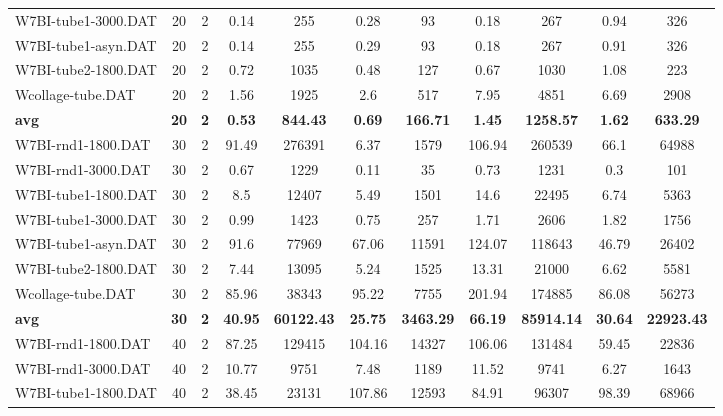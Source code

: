 \begin{table}[!ht]
\begin{tabular}{lcccccccccc}
W7BI-tube1-3000.DAT & 20 & 2 &  \textcolor{blue2}{0.14} & 255 & 0.28 & 93 & 0.18 & 267 & 0.94 & 326 \\
W7BI-tube1-asyn.DAT & 20 & 2 &  \textcolor{blue2}{0.14} & 255 & 0.29 & 93 & 0.18 & 267 & 0.91 & 326 \\
W7BI-tube2-1800.DAT & 20 & 2 & 0.72 & 1035 &  \textcolor{blue2}{0.48} & 127 & 0.67 & 1030 & 1.08 & 223 \\
Wcollage-tube.DAT & 20 & 2 &  \textcolor{blue2}{1.56} & 1925 & 2.6 & 517 & 7.95 & 4851 & 6.69 & 2908 \\
\cline{1-11} \textbf{avg} & \textbf{20} & \textbf{2} & \textbf{0.53} & \textbf{844.43} & \textbf{0.69} & \textbf{166.71} & \textbf{1.45} & \textbf{1258.57} & \textbf{1.62} & \textbf{633.29} \\ \cline{1-11}
W7BI-rnd1-1800.DAT & 30 & 2 & 91.49 & 276391 &  \textcolor{blue2}{6.37} & 1579 & 106.94 & 260539 & 66.1 & 64988 \\
W7BI-rnd1-3000.DAT & 30 & 2 & 0.67 & 1229 &  \textcolor{blue2}{0.11} & 35 & 0.73 & 1231 & 0.3 & 101 \\
W7BI-tube1-1800.DAT & 30 & 2 & 8.5 & 12407 &  \textcolor{blue2}{5.49} & 1501 & 14.6 & 22495 & 6.74 & 5363 \\
W7BI-tube1-3000.DAT & 30 & 2 & 0.99 & 1423 &  \textcolor{blue2}{0.75} & 257 & 1.71 & 2606 & 1.82 & 1756 \\
W7BI-tube1-asyn.DAT & 30 & 2 & 91.6 & 77969 & 67.06 & 11591 & 124.07 & 118643 &  \textcolor{blue2}{46.79} & 26402 \\
W7BI-tube2-1800.DAT & 30 & 2 & 7.44 & 13095 &  \textcolor{blue2}{5.24} & 1525 & 13.31 & 21000 & 6.62 & 5581 \\
Wcollage-tube.DAT & 30 & 2 &  \textcolor{blue2}{85.96} & 38343 & 95.22 & 7755 & 201.94 & 174885 & 86.08 & 56273 \\
\cline{1-11} \textbf{avg} & \textbf{30} & \textbf{2} & \textbf{40.95} & \textbf{60122.43} & \textbf{25.75} & \textbf{3463.29} & \textbf{66.19} & \textbf{85914.14} & \textbf{30.64} & \textbf{22923.43} \\ \cline{1-11}
W7BI-rnd1-1800.DAT & 40 & 2 & 87.25 & 129415 & 104.16 & 14327 & 106.06 & 131484 &  \textcolor{blue2}{59.45} & 22836 \\
W7BI-rnd1-3000.DAT & 40 & 2 & 10.77 & 9751 & 7.48 & 1189 & 11.52 & 9741 &  \textcolor{blue2}{6.27} & 1643 \\
W7BI-tube1-1800.DAT & 40 & 2 &  \textcolor{blue2}{38.45} & 23131 & 107.86 & 12593 & 84.91 & 96307 & 98.39 & 68966 \\

\end{tabular}
\end{table}

